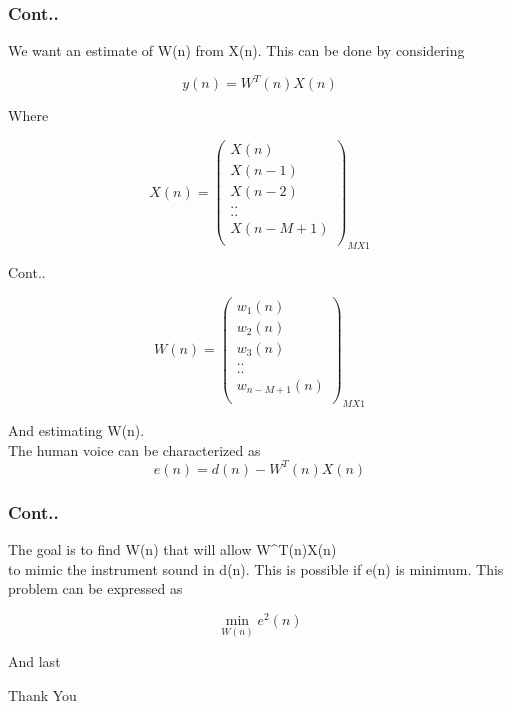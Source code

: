 \documentclass{beamer}
\begin{document}
\begin{frame}
\frametitle{Cont..}
We want an estimate
of W(n) from X(n). This can be done by
considering
\begin{center}
\begin{equation*}
     y(n) = W^{T}(n)X(n)
\end{equation*}
\end{center}
 Where
 \begin{center}
\begin{equation*}
     X(n) = {\begin{pmatrix}

X(n)\\
X(n-1)\\
X(n-2)\\
..\\
..\\
X(n-M+1)\\
\end{pmatrix}}_{MX1}
\end{equation*}
\end{center}
\end{frame}



\begin{frame}{Cont..}
 \begin{center}
\begin{equation*}
     W(n) = {\begin{pmatrix}

w_1(n)\\
w_2(n)\\
w_3(n)\\
..\\
..\\
w_{n-M+1}(n)\\
\end{pmatrix}}_{MX1}
\end{equation*}
\end{center}
And estimating W(n).\\
The human voice can be characterized as
\begin{equation*}
    e(n) = d(n)-W^{T}(n)X(n)
\end{equation*}
\end{frame}


\begin{frame}
\frametitle{Cont..}
The goal is to find W(n) that will allow W^{T}(n)X(n)\\
to mimic the instrument sound in d(n). This is
possible if e(n) is minimum. This problem can be
expressed as
\begin{center}
\begin{equation*}
     \min_{W(n)} e^{2}(n)
\end{equation*}
   
\end{center}
\end{frame}










\begin{frame}{And last}
\begin{center}
    Thank You
\end{center}
\end{frame}
\end{document}
